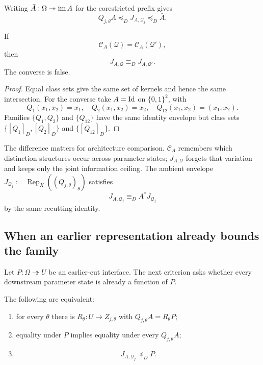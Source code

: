 Writing $\bar A:\Omega\twoheadrightarrow\operatorname{im} A$ for the corestricted prefix gives
\begin{equation}\label{eq:distinction-hierarchy-v13}
\boxed{
Q_{j,\theta}A
\preceq_D
J_{A,\mathcal Q_j}
\preceq_D
\bar A.
}
\end{equation}

\begin{proposition}\label{prop:classes-vs-envelope-v13}
If
\[
\mathcal C_A(\mathcal Q)=\mathcal C_A(\mathcal Q'),
\]
then
\[
J_{A,\mathcal Q}\equiv_DJ_{A,\mathcal Q'}.
\]
The converse is false.
\end{proposition}

\begin{proof}
Equal class sets give the same set of kernels and hence the same intersection. For the converse take $A=\operatorname{Id}$ on $\{0,1\}^2$, with
\[
Q_1(x_1,x_2)=x_1,
\quad
Q_2(x_1,x_2)=x_2,
\quad
Q_{12}(x_1,x_2)=(x_1,x_2).
\]
Families $\{Q_1,Q_2\}$ and $\{Q_{12}\}$ have the same identity envelope but class sets $\{[Q_1]_D,[Q_2]_D\}$ and $\{[Q_{12}]_D\}$.
\end{proof}

The difference matters for architecture comparison. $\mathcal C_A$ remembers which distinction structures occur across parameter states; $J_{A,\mathcal Q}$ forgets that variation and keeps only the joint information ceiling. The ambient envelope $J_{\mathcal Q_j}:=\operatorname{Rep}_X((Q_{j,\theta})_\theta)$ satisfies
\[
J_{A,\mathcal Q_j}\equiv_DA^*J_{\mathcal Q_j}
\]
by the same recutting identity.

\subsection{When an earlier representation already bounds the family}

Let $P:\Omega\twoheadrightarrow U$ be an earlier-cut interface. The next criterion asks whether every downstream parameter state is already a function of $P$.

\begin{proposition}\label{prop:uniform-factorization-v13}
The following are equivalent:
\begin{enumerate}[label=(\roman*)]
\item for every $\theta$ there is $R_\theta:U\to Z_{j,\theta}$ with $Q_{j,\theta}A=R_\theta P$;
\item equality under $P$ implies equality under every $Q_{j,\theta}A$;
\item
\[
\boxed{J_{A,\mathcal Q_j}\preceq_DP.}
\]
\end{enumerate}
\end{proposition}

